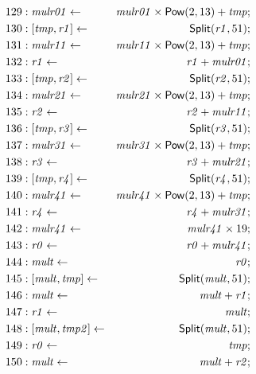 {\begin{multicols}{2}
\begin{align*}
129 &: \mathit{mulr01} \leftarrow & \mathit{mulr01} \times \dslcode{Pow}(2, 13) + \mathit{tmp}; \\
130 &: \concat{\mathit{tmp}}{\mathit{r1}} \leftarrow & \dslcode{Split}(\mathit{r1}, 51); \\
131 &: \mathit{mulr11} \leftarrow & \mathit{mulr11} \times \dslcode{Pow}(2, 13) + \mathit{tmp}; \\
132 &: \mathit{r1} \leftarrow & \mathit{r1} + \mathit{mulr01}; \\
133 &: \concat{\mathit{tmp}}{\mathit{r2}} \leftarrow & \dslcode{Split}(\mathit{r2}, 51); \\
134 &: \mathit{mulr21} \leftarrow & \mathit{mulr21} \times \dslcode{Pow}(2, 13) + \mathit{tmp}; \\
135 &: \mathit{r2} \leftarrow & \mathit{r2} + \mathit{mulr11}; \\
136 &: \concat{\mathit{tmp}}{\mathit{r3}} \leftarrow & \dslcode{Split}(\mathit{r3}, 51); \\
137 &: \mathit{mulr31} \leftarrow & \mathit{mulr31} \times \dslcode{Pow}(2, 13) + \mathit{tmp}; \\
138 &: \mathit{r3} \leftarrow & \mathit{r3} + \mathit{mulr21}; \\
139 &: \concat{\mathit{tmp}}{\mathit{r4}} \leftarrow & \dslcode{Split}(\mathit{r4}, 51); \\
140 &: \mathit{mulr41} \leftarrow & \mathit{mulr41} \times \dslcode{Pow}(2, 13) + \mathit{tmp}; \\
141 &: \mathit{r4} \leftarrow & \mathit{r4} + \mathit{mulr31}; \\
142 &: \mathit{mulr41} \leftarrow & \mathit{mulr41} \times 19; \\
143 &: \mathit{r0} \leftarrow & \mathit{r0} + \mathit{mulr41}; \\
144 &: \mathit{mult} \leftarrow & \mathit{r0}; \\
145 &: \concat{\mathit{mult}}{\mathit{tmp}} \leftarrow & \dslcode{Split}(\mathit{mult}, 51); \\
146 &: \mathit{mult} \leftarrow & \mathit{mult} + \mathit{r1}; \\
147 &: \mathit{r1} \leftarrow & \mathit{mult}; \\
148 &: \concat{\mathit{mult}}{\mathit{tmp2}} \leftarrow & \dslcode{Split}(\mathit{mult}, 51); \\
149 &: \mathit{r0} \leftarrow & \mathit{tmp}; \\
150 &: \mathit{mult} \leftarrow & \mathit{mult} + \mathit{r2}; \\

\end{align*}
\end{multicols}}
